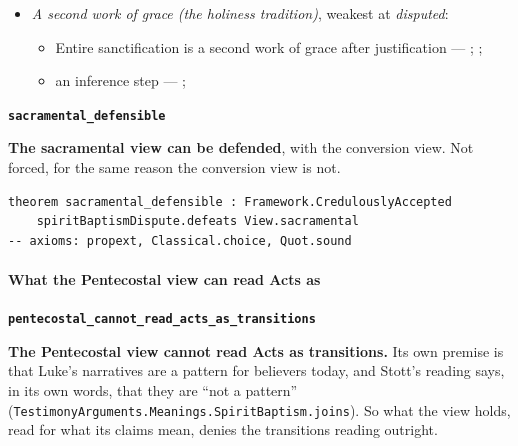 \documentclass[11pt]{article}
\begin{document}
\begin{itemize}
\begin{itemize}
\item Luke’s narratives of receiving the Spirit are a pattern for believers today --- \cite{stronstad-charismatic-theology-1984}; \cite{assemblies-of-god-baptism-holy-spirit-2010}
\item an inference step --- \cite{assemblies-of-god-baptism-holy-spirit-2010}; \cite{dunn-baptism-holy-spirit-1970}; \cite{stott-baptism-fullness-1975}
\end{itemize}
\item \emph{A second work of grace (the holiness tradition)}, weakest at \emph{disputed}:
\begin{itemize}
\item Entire sanctification is a second work of grace after justification --- \cite[Articles of Faith, X, ¶10]{church-of-the-nazarene-manual-2023}; \cite[to Joseph Benson, 28 December 1770]{wesley-letters-1931}; \cite{bassett-white-paper-article-x-2010}
\item an inference step --- \cite[to Joseph Benson, 28 December 1770]{wesley-letters-1931}; \cite{bassett-white-paper-article-x-2010}
\end{itemize}
\end{itemize}
\par\medskip\noindent\textbf{\texttt{sacramental\_\allowbreak{}defensible}}\par\nobreak\noindent
\textbf{The sacramental view can be defended}, with the conversion view. Not forced, for the same reason the conversion view is not.

{\small\begin{verbatim}
theorem sacramental_defensible : Framework.CredulouslyAccepted
    spiritBaptismDispute.defeats View.sacramental
-- axioms: propext, Classical.choice, Quot.sound
\end{verbatim}}
\paragraph*{What the Pentecostal view can read Acts as}
\leavevmode\par\nobreak
\par\medskip\noindent\textbf{\texttt{pentecostal\_\allowbreak{}cannot\_\allowbreak{}read\_\allowbreak{}acts\_\allowbreak{}as\_\allowbreak{}transitions}}\par\nobreak\noindent
\textbf{The Pentecostal view cannot read Acts as transitions.} Its own premise is that Luke’s narratives are a pattern for believers today, and Stott’s reading says, in its own words, that they are “not a pattern” (\texttt{Testimony\allowbreak{}Arguments.Meanings.Spirit\allowbreak{}Baptism.joins}). So what the view holds, read for what its claims mean, denies the transitions reading outright.
\end{document}
